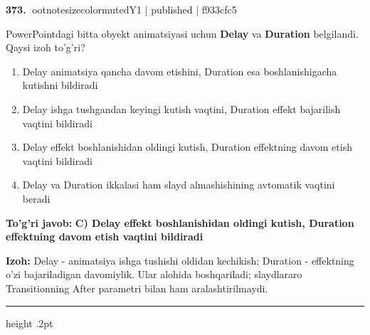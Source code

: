 \documentclass[10pt,a4paper]{article}
\begin{document}
\textbf{\color{ink}373.} {ootnotesizecolor{muted}Y1 | published | f933cfc5}
\par
PowerPointdagi bitta obyekt animatsiyasi uchun \textbf{Delay} va \textbf{Duration} belgilandi. Qaysi izoh to'g'ri?
\begin{enumerate}[label=\Alph*),leftmargin=9mm]
\item Delay animatsiya qancha davom etishini, Duration esa boshlanishigacha kutishni bildiradi
\item Delay ishga tushgandan keyingi kutish vaqtini, Duration effekt bajarilish vaqtini bildiradi
\item Delay effekt boshlanishidan oldingi kutish, Duration effektning davom etish vaqtini bildiradi
\item Delay va Duration ikkalasi ham slayd almashishining avtomatik vaqtini beradi
\end{enumerate}
\begin{tcolorbox}[enhanced,breakable,colback=teal!4,colframe=teal!55!black,boxrule=0.45pt,arc=1.2mm,left=2.8mm,right=2.8mm,top=2mm,bottom=2mm]
\textbf{\color{teal}To'g'ri javob:} \textbf{C) Delay effekt boshlanishidan oldingi kutish, Duration effektning davom etish vaqtini bildiradi}
\par\smallskip
\textbf{Izoh:} Delay - animatsiya ishga tushishi oldidan kechikish; Duration - effektning o'zi bajariladigan davomiylik. Ular alohida boshqariladi; slaydlararo Transitionning After parametri bilan ham aralashtirilmaydi.
\end{tcolorbox}
\vspace{2mm}\hrule height .2pt\vspace{2mm}
\end{document}
